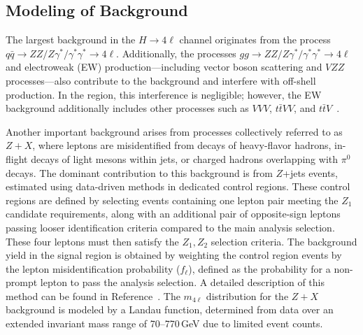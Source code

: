 
\subsection{Modeling of Background}

The largest background in the $H \to 4\ell$ channel originates from the process $q\bar{q} \to ZZ/Z\gamma^*/\gamma^*\gamma^* \to 4\ell$. Additionally, the processes $gg \to ZZ/Z\gamma^*/\gamma^*\gamma^* \to 4\ell$ and electroweak (EW) production---including vector boson scattering and $VZZ$ processes---also contribute to the background and interfere with off-shell \Hboson production. In the \onshell region, this interference is negligible; however, the EW background additionally includes other processes such as $VVV$, $t\bar{t}VV$, and $t\bar{t}V$~\cite{PhysRevD.111.092014}. 

Another important background arises from processes collectively referred to as $Z+X$, where leptons are misidentified from decays of heavy-flavor hadrons, in-flight decays of light mesons within jets, or charged hadrons overlapping with $\pi^0$ decays. The dominant contribution to this background is from $Z$+jets events, estimated using data-driven methods in dedicated control regions. These control regions are defined by selecting events containing one lepton pair meeting the ${Z}_{1}$ candidate requirements, along with an additional pair of opposite-sign leptons passing looser identification criteria compared to the main analysis selection. These four leptons must then satisfy the ${Z}_{1}, {Z}_{2}$ selection criteria. The background yield in the signal region is obtained by weighting the control region events by the lepton misidentification probability ($f_{\ell}$), defined as the probability for a non-prompt lepton to pass the analysis selection. A detailed description of this method can be found in Reference~\cite{Sirunyan:2017exp}. The $m_{4\ell}$ distribution for the $Z+X$ background is modeled by a Landau function, determined from data over an extended invariant mass range of 70--770\,GeV due to limited event counts.

